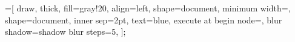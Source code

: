 \documentclass[16pt]{book}
\begin{document}



\tableofcontents

\newpage
\listoffigures
{}=[%
draw,
thick,
fill=gray!20,
align=left,
shape=document,
minimum width=,
shape=document,
inner sep=2pt,
text=blue,
execute at begin node=\setlength{\baselineskip}{19pt},
blur shadow={shadow blur steps=5},
];













\end{document}
